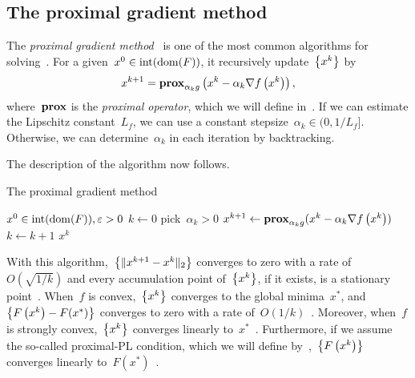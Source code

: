 \documentclass[../../main]{subfiles}
\begin{document}
\subsection{The proximal gradient method} 
The \emph{proximal gradient method}~\cite{Fukushima1981} is one of the most common algorithms for solving~.
For a given~$x^0 \in \interior (\dom (F))$, it recursively update~$\set*{x^k} $ by
\begin{equation}
    x^{k + 1} = \prox_{\alpha_k g} \left( x^k - \alpha_k \nabla f\left(x^k\right) \right) 
,\end{equation} 
where~$\prox$ is the \emph{proximal operator}, which we will define in~.
If we can estimate the Lipschitz constant~$L_f$, we can use a constant stepsize~$\alpha_k \in (0, 1 / L_f]$.
Otherwise, we can determine~$\alpha_k$ in each iteration by backtracking.

The description of the algorithm now follows.
\begin{algorithm}[hbtp]
    \caption{The proximal gradient method}
    \begin{algorithmic}[1]
        \Require $x^0 \in \interior (\dom (F)), \varepsilon > 0$
        \State $k \gets 0$
        \Repeat
        \State pick~$\alpha_k > 0$
        \State $x^{k + 1} \gets \prox_{\alpha_k g}(x^k - \alpha_k \nabla f\left(x^k\right))$
        \State $k \gets k + 1$
        \State \Return $x^k$
    \end{algorithmic}
\end{algorithm}

With this algorithm,~$\set*{\norm{x^{k + 1} - x^k}_2}$ converges to zero with a rate of~$O\left(\sqrt{1 / k}\right)$ and every accumulation point of~$\set*{x^k}$, if it exists, is a stationary point~\cite{Beck2017}.
When~$f$ is convex,~$\set*{x^k}$ converges to the global minima~$x^\ast$, and~$\set*{F\left(x^k\right) - F(x^\ast)}$ converges to zero with a rate of~$O(1 / k)$~\cite{Beck2017}.
Moreover, when~$f$ is strongly convex,~$\set*{x^k}$ converges linearly to~$x^\ast$~\cite{Beck2017}.
Furthermore, if we assume the so-called proximal-PL condition, which we will define by~,~$\set*{F\left(x^k\right)}$ converges linearly to~$F(x^\ast)$~\cite{Karimi2016}.
\end{document}
